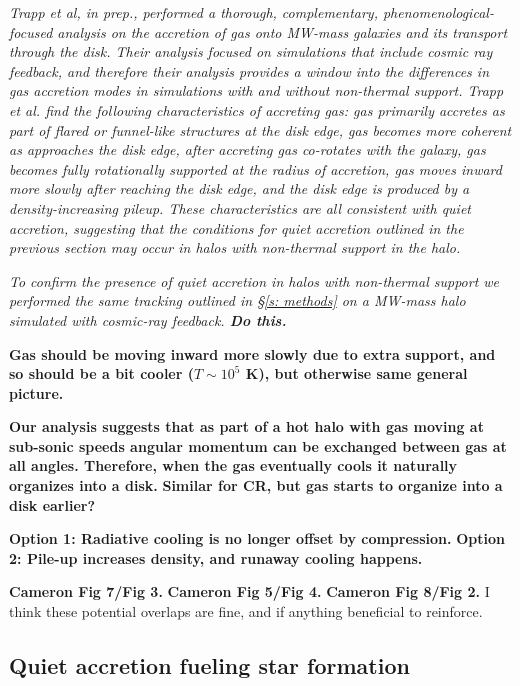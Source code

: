 \documentclass[fleqn,usenatbib]{mnras}
\begin{document}
\textit{
Trapp et al, in prep., performed a thorough, complementary, phenomenological-focused analysis on the accretion of gas onto MW-mass galaxies and its transport through the disk.
Their analysis focused on simulations that include cosmic ray feedback, and therefore their analysis provides a window into the differences in gas accretion modes in simulations with and without non-thermal support.
Trapp et al. find the following characteristics of accreting gas:
gas primarily accretes as part of flared or funnel-like structures at the disk edge,
gas becomes more coherent as approaches the disk edge,
after accreting gas co-rotates with the galaxy,
gas becomes fully rotationally supported at the radius of accretion,
gas moves inward more slowly after reaching the disk edge,
and the disk edge is produced by a density-increasing pileup.
These characteristics are all consistent with quiet accretion, suggesting that the conditions for quiet accretion outlined in the previous section may occur in halos with non-thermal support in the halo.
}

\textit{
To confirm the presence of quiet accretion in halos with non-thermal support we performed the same tracking outlined in \S\ref{s: methods} on a MW-mass halo simulated with cosmic-ray feedback.
\textbf{Do this.}
}


\textbf{Gas should be moving inward more slowly due to extra support, and so should be a bit cooler ($T\sim 10^5$ K), but otherwise same general picture.}

\textbf{
Our analysis suggests that as part of a hot halo with gas moving at sub-sonic speeds angular momentum can be exchanged between gas at all angles.
Therefore, when the gas eventually cools it naturally organizes into a disk.
}
\textbf{
Similar for CR, but gas starts to organize into a disk earlier?
}

\textbf{Option 1: Radiative cooling is no longer offset by compression.}
\textbf{Option 2: Pile-up increases density, and runaway cooling happens.}

\textbf{Cameron Fig 7/Fig 3.}
\textbf{Cameron Fig 5/Fig 4.}
\textbf{Cameron Fig 8/Fig 2.}
I think these potential overlaps are fine, and if anything beneficial to reinforce.

\subsection{Quiet accretion fueling star formation}
\label{s: fueling}
\end{document}
